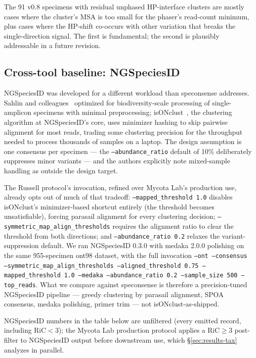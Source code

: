 \documentclass[11pt]{article}
\begin{document}
The 91 v0.8 specimens with residual unphased HP-interface clusters are
mostly cases where the cluster's MSA is too small for the phaser's
read-count minimum, plus cases where the HP-shift co-occurs with
other variation that breaks the single-direction signal. The first is
fundamental; the second is plausibly addressable in a future revision.

\subsection{Cross-tool baseline: NGSpeciesID}
\label{sec:results-ngsi}

NGSpeciesID was developed for a different workload than speconsense
addresses. Sahlin and colleagues~\cite{ngspeciesid} optimized for
biodiversity-scale processing of single-amplicon specimens with minimal
preprocessing; isONclust~\cite{isonclust}, the clustering algorithm at
NGSpeciesID's core, uses minimizer hashing to skip pairwise alignment
for most reads, trading some clustering precision for the throughput
needed to process thousands of samples on a laptop. The design
assumption is one consensus per specimen --- the
\texttt{--abundance\_ratio} default of 10\% deliberately suppresses
minor variants --- and the authors explicitly note mixed-sample
handling as outside the design target.

The Russell protocol's invocation, refined over Mycota Lab's production
use, already opts out of much of that tradeoff:
\texttt{--mapped\_threshold 1.0} disables isONclust's minimizer-based
shortcut entirely (the threshold becomes unsatisfiable), forcing
parasail alignment for every clustering decision;
\texttt{--symmetric\_map\_align\_thresholds} requires the alignment
ratio to clear the threshold from both directions; and
\texttt{--abundance\_ratio 0.2} relaxes the variant-suppression default.
We ran NGSpeciesID 0.3.0 with medaka 2.0.0 polishing on the same
955-specimen ont98 dataset, with the full invocation \texttt{--ont
--consensus --symmetric\_map\_align\_thresholds --aligned\_threshold
0.75 --mapped\_threshold 1.0 --medaka --abundance\_ratio 0.2
--sample\_size 500 --top\_reads}. What we compare against speconsense
is therefore a precision-tuned NGSpeciesID pipeline --- greedy
clustering by parasail alignment, SPOA consensus, medaka polishing,
primer trim --- not isONclust-as-shipped.

NGSpeciesID numbers in the table below are unfiltered (every emitted
record, including RiC$<$3); the Mycota Lab production protocol applies
a RiC$\geq$3 post-filter to NGSpeciesID output before downstream use,
which §\ref{sec:results-tax} analyzes in parallel.
\end{document}
